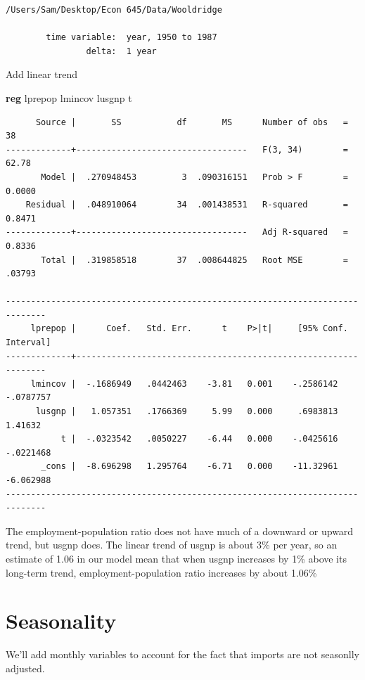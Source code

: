 \documentclass[
]{book}
\newenvironment{Shaded}{\begin{snugshade}}{\end{snugshade}}
\newcommand{\KeywordTok}[1]{\textcolor[rgb]{0.13,0.29,0.53}{\textbf{#1}}}
\newcommand{\NormalTok}[1]{#1}
\begin{document}
\begin{verbatim}
/Users/Sam/Desktop/Econ 645/Data/Wooldridge

        time variable:  year, 1950 to 1987
                delta:  1 year
\end{verbatim}

Add linear trend

\begin{Shaded}
\begin{Highlighting}[]
\KeywordTok{reg}\NormalTok{ lprepop lmincov lusgnp t}
\end{Highlighting}
\end{Shaded}

\begin{verbatim}
      Source |       SS           df       MS      Number of obs   =        38
-------------+----------------------------------   F(3, 34)        =     62.78
       Model |  .270948453         3  .090316151   Prob > F        =    0.0000
    Residual |  .048910064        34  .001438531   R-squared       =    0.8471
-------------+----------------------------------   Adj R-squared   =    0.8336
       Total |  .319858518        37  .008644825   Root MSE        =    .03793

------------------------------------------------------------------------------
     lprepop |      Coef.   Std. Err.      t    P>|t|     [95% Conf. Interval]
-------------+----------------------------------------------------------------
     lmincov |  -.1686949   .0442463    -3.81   0.001    -.2586142   -.0787757
      lusgnp |   1.057351   .1766369     5.99   0.000     .6983813     1.41632
           t |  -.0323542   .0050227    -6.44   0.000    -.0425616   -.0221468
       _cons |  -8.696298   1.295764    -6.71   0.000    -11.32961   -6.062988
------------------------------------------------------------------------------
\end{verbatim}

The employment-population ratio does not have much of a downward or upward trend,
but usgnp does. Тhe linear trend of usgnp is about 3\% per year, so an estimate
of 1.06 in our model mean that when usgnp increases by 1\% above its long-term
trend, employment-population ratio increases by about 1.06\%

\chapter{Seasonality}\label{seasonality}

We'll add monthly variables to account for the fact that imports are not
seasonlly adjusted.
\end{document}
